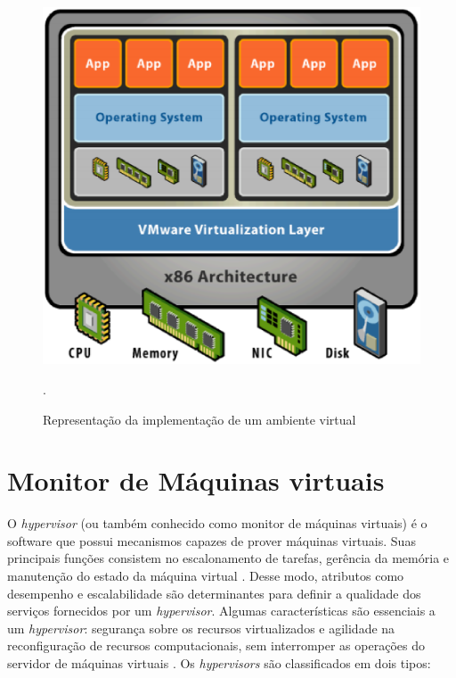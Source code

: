 \begin{figure}[!htb]
\centering
\includegraphics [keepaspectratio=true,scale=0.40]{figuras/virtualization_arc_2.eps}
\caption{Representação da implementação de um ambiente virtual}
\cite{junior}.
\label{arc_virtualization}
\end{figure} 
 
\section{Monitor de Máquinas virtuais}
O \textit{hypervisor} (ou também conhecido como monitor de máquinas virtuais) é o software que possui mecanismos capazes de prover máquinas virtuais. Suas principais funções consistem no escalonamento de tarefas, gerência da memória e manutenção do estado da máquina virtual \cite{manoel}. Desse modo, atributos como desempenho e escalabilidade são determinantes para definir a qualidade dos serviços fornecidos por um \textit{hypervisor}. Algumas características são essenciais a um \textit{hypervisor}: segurança sobre os recursos virtualizados e agilidade na reconfiguração de recursos computacionais, sem interromper as operações do servidor de máquinas virtuais \cite{manoel}. Os \textit{hypervisors} são classificados em dois tipos:

